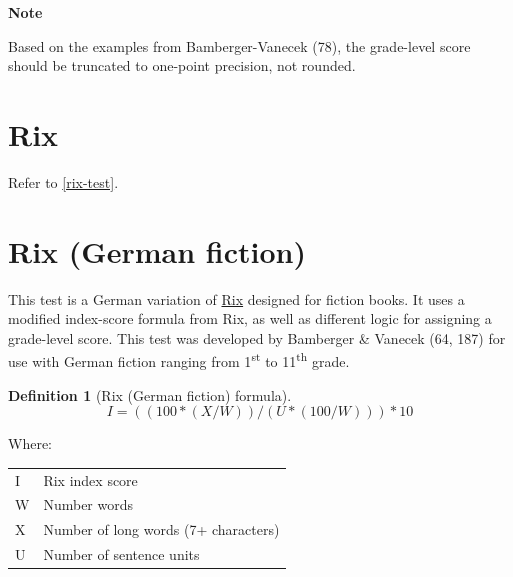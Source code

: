 \documentclass[
]{book}
\newenvironment{notesection}
    {
    \begin{tcolorbox}[colframe=mediumblue,colback=lightblue,coltext=mediumblue,arc=3mm]
    \faLightbulb[regular] \textbf{Note} \newline
    }
    {
    \end{tcolorbox}
    }
\theoremstyle{definition}
\newtheorem{definition}{Definition}[chapter]
\theoremstyle{definition}
\theoremstyle{definition}
\theoremstyle{definition}
\theoremstyle{remark}
\begin{document}
\begin{notesection}
Based on the examples from Bamberger-Vanecek (78), the grade-level score should be truncated to one-point precision, not rounded.

\end{notesection}

\newpage

\hypertarget{rix-german}{%
\section{Rix}\label{rix-german}}

Refer to \ref{rix-test}.

\hypertarget{rix-german-fiction}{%
\section{\texorpdfstring{Rix (German fiction)}{Rix (German fiction)}}\label{rix-german-fiction}}

This test is a German variation of \protect\hyperlink{rix-test}{Rix} designed for fiction books. It uses a modified index-score formula from Rix, as well as different logic for assigning a grade-level score. This test was developed by Bamberger \& Vanecek (64, 187) for use with German fiction ranging from 1\textsuperscript{st} to 11\textsuperscript{th} grade.

\begin{definition}[Rix (German fiction) formula]
\protect\hypertarget{def:rixfictionde}{}{\label{def:rixfictionde} {} }\[
I = ((100*(X/W))/(U*(100/W))) * 10
\]
\end{definition}

Where:

\begin{longtable}[]{@{}
  >{\raggedright\arraybackslash}p{}
  >{\raggedright\arraybackslash}p{}@{}}
\toprule
\endhead
I & Rix index score \\
W & Number words \\
X & Number of long words (7+ characters) \\
U & Number of sentence units \\
\bottomrule
\end{longtable}
\end{document}
